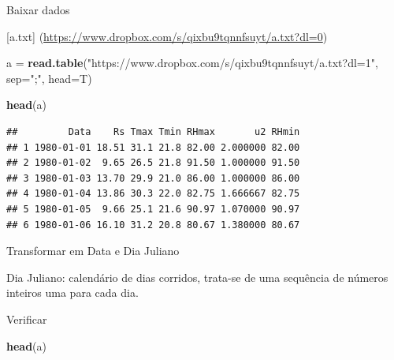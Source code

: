 \documentclass[
]{book}
\newenvironment{Shaded}{\begin{snugshade}}{\end{snugshade}}
\newcommand{\DataTypeTok}[1]{\textcolor[rgb]{0.13,0.29,0.53}{#1}}
\newcommand{\KeywordTok}[1]{\textcolor[rgb]{0.13,0.29,0.53}{\textbf{#1}}}
\newcommand{\NormalTok}[1]{#1}
\newcommand{\OperatorTok}[1]{\textcolor[rgb]{0.81,0.36,0.00}{\textbf{#1}}}
\newcommand{\StringTok}[1]{\textcolor[rgb]{0.31,0.60,0.02}{#1}}
\begin{document}
Baixar dados

{[}a.txt{]} (\url{https://www.dropbox.com/s/qixbu9tqnnfsuyt/a.txt?dl=0})

\begin{Shaded}
\begin{Highlighting}[]
\NormalTok{ a =}\StringTok{ }\KeywordTok{read.table}\NormalTok{(}\StringTok{"https://www.dropbox.com/s/qixbu9tqnnfsuyt/a.txt?dl=1"}\NormalTok{, }\DataTypeTok{sep=}\StringTok{";"}\NormalTok{, }\DataTypeTok{head=}\NormalTok{T)}
  
\KeywordTok{head}\NormalTok{(a)}
\end{Highlighting}
\end{Shaded}

\begin{verbatim}
##         Data    Rs Tmax Tmin RHmax       u2 RHmin
## 1 1980-01-01 18.51 31.1 21.8 82.00 2.000000 82.00
## 2 1980-01-02  9.65 26.5 21.8 91.50 1.000000 91.50
## 3 1980-01-03 13.70 29.9 21.0 86.00 1.000000 86.00
## 4 1980-01-04 13.86 30.3 22.0 82.75 1.666667 82.75
## 5 1980-01-05  9.66 25.1 21.6 90.97 1.070000 90.97
## 6 1980-01-06 16.10 31.2 20.8 80.67 1.380000 80.67
\end{verbatim}

Transformar em Data e Dia Juliano

\begin{Shaded}
\end{Shaded}

Dia Juliano: calendário de dias corridos, trata-se de uma sequência de números inteiros uma para cada dia.

\begin{Shaded}
\end{Shaded}

Verificar

\begin{Shaded}
\begin{Highlighting}[]
\KeywordTok{head}\NormalTok{(a)}
\end{Highlighting}
\end{Shaded}
\end{document}
